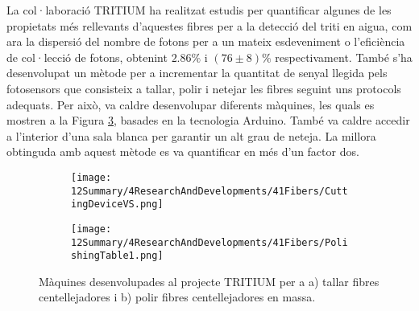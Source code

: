 La col·laboració TRITIUM ha realitzat estudis per quantificar algunes de les propietats més rellevants d'aquestes fibres per a la detecció del triti en aigua, com ara la dispersió del nombre de fotons per a un mateix esdeveniment o l'eficiència de col·lecció de fotons, obtenint $2.86\%$ i $(76 \pm 8)\%$ respectivament. També s'ha desenvolupat un mètode per a incrementar la quantitat de senyal llegida pels fotosensors que consisteix a tallar, polir i netejar les fibres seguint uns protocols adequats. Per això, va caldre desenvolupar diferents màquines, les quals es mostren a la Figura \ref{fig:MaquinesTRITIUM}, basades en la tecnologia Arduino. També va caldre accedir a l'interior d'una sala blanca per garantir un alt grau de neteja. La millora obtinguda amb aquest mètode es va quantificar en més d'un factor dos. 

\begin{figure}
\centering
    \begin{subfigure}[b]{0.5\textwidth}
    \centering
    \texttt{[image: 12Summary/4ResearchAndDevelopments/41Fibers/CuttingDeviceVS.png]}  
    \caption{\label{subfig:MaquinaTallar}}
    \end{subfigure}
    \hfill
    \begin{subfigure}[b]{0.45\textwidth}
    \centering
    \texttt{[image: 12Summary/4ResearchAndDevelopments/41Fibers/PolishingTable1.png]}  
    \caption{\label{subfig:MaquinaPolir}}
    \end{subfigure}
 \caption{Màquines desenvolupades al projecte TRITIUM per a a) tallar fibres centellejadores i b) polir fibres centellejadores en massa. \label{fig:MaquinesTRITIUM}}
\end{figure}